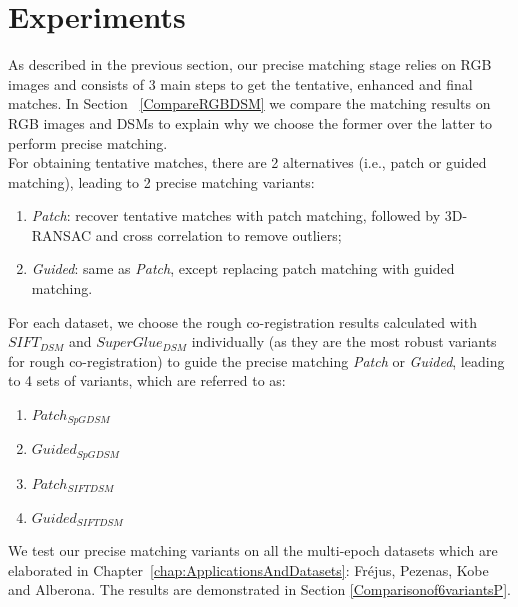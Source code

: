 \section{Experiments}
As described in the previous section, our precise matching stage relies on RGB images and consists of 3 main steps to get the tentative, enhanced and final matches. In Section ~\ref{CompareRGBDSM} we compare the matching results on RGB images and \ac{DSM}s to explain why we choose the former over the latter to perform precise matching.\\
For obtaining tentative matches, there are 2 alternatives (i.e., patch or guided matching), leading to 2 precise matching variants:\\
\begin{enumerate}
	\item \textit{Patch}: recover tentative matches with patch matching, followed by 3D-RANSAC and cross correlation to remove outliers;
	\item \textit{Guided}: same as \textit{Patch}, except replacing patch matching with guided matching.
\end{enumerate}
For each dataset, we choose the rough co-registration results calculated with $SIFT_{DSM}$ and $SuperGlue_{DSM}$ individually (as they are the most robust variants for rough co-registration) to guide the precise matching \textit{Patch} or \textit{Guided}, leading to 4 sets of variants, which are referred to as:\\
\begin{enumerate}
	\item $Patch_{SpGDSM}$
	\item $Guided_{SpGDSM}$
	\item $Patch_{SIFTDSM}$
	\item $Guided_{SIFTDSM}$
\end{enumerate}
We test our precise matching variants on all the multi-epoch datasets which are elaborated in Chapter~\ref{chap:ApplicationsAndDatasets}: Fr{\'e}jus, Pezenas, Kobe and Alberona. The results are demonstrated in Section \ref{Comparisonof6variantsP}.

